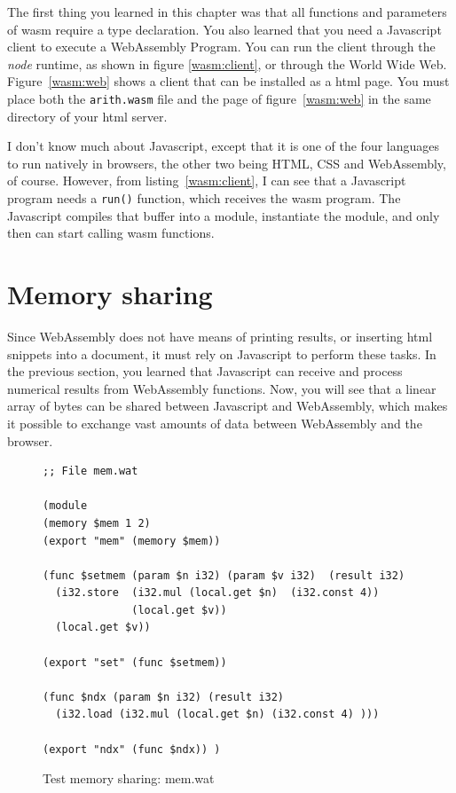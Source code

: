 \documentclass[a4paper,12pt]{book}
\begin{document}
The first thing you learned in this
chapter was that all functions and parameters
of wasm require a type declaration. You also 
learned that you need a Javascript client
to execute a WebAssembly Program. You can run
the client through the {\em node} runtime, as
shown in figure \ref{wasm:client}, or through the
World Wide Web. Figure~\ref{wasm:web} shows
a client that can be installed as a html page.
You must place both the \verb|arith.wasm| file
and the page of figure~\ref{wasm:web} in the same
directory of your html server.

I don't know much about Javascript, except that
it is one of the four languages to run natively
in browsers, the other two being HTML, CSS and
WebAssembly, of course. However, from
listing~\ref{wasm:client}, I can see that
a Javascript program needs a \verb|run()|
function, which receives the wasm program.
The Javascript compiles that buffer into a module,
instantiate the module, and only then can start
calling wasm functions.


\section{Memory sharing}
Since WebAssembly does not have means of printing results,
or inserting html snippets into a document, it must rely
on Javascript to perform these tasks. In the previous section,
you learned that Javascript can receive and process
numerical results from WebAssembly functions. Now, you will
see that a linear array of bytes can be shared between
Javascript and WebAssembly, which makes it possible
to exchange vast amounts of data between WebAssembly
and the browser.

\begin{figure}[!h]
\begin{verbatim}
;; File mem.wat

(module
(memory $mem 1 2)
(export "mem" (memory $mem))

(func $setmem (param $n i32) (param $v i32)  (result i32)
  (i32.store  (i32.mul (local.get $n)  (i32.const 4))
              (local.get $v))
  (local.get $v))
  
(export "set" (func $setmem))

(func $ndx (param $n i32) (result i32)
  (i32.load (i32.mul (local.get $n) (i32.const 4) )))
  
(export "ndx" (func $ndx)) )
\end{verbatim}
  \caption{Test memory sharing: mem.wat}
  \label{wasm:memsharing}
\end{figure}
\end{document}
